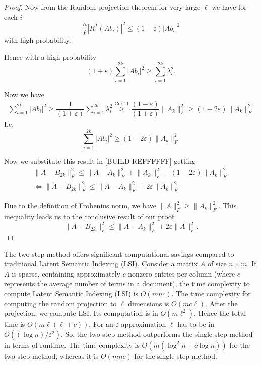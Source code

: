 \documentclass[a4paper,11pt,DIV=15]{scrartcl} %
\renewcommand{\epsilon}{\varepsilon}
\theoremstyle{plain}
\theoremstyle{definition}
\begin{document}
\begin{proof}
Now from the Random projection theorem for very large $\ell$ we have for each $i$
\[
 \dfrac{n}{\ell}| R^T (Ab_i)|^2 \leq (1+\epsilon) |Ab_i|^2
\]
with high probability.

Hence with a high probability
\[
(1+\epsilon) \sum_{i=1}^{2k} |A b_i|^2 \geq \sum_{i=1}^{2k} \lambda_i^2.
\]

Now we have
\begin{align*}
    \sum_{i=1}^{2k} |A b_i|^2 \geq \dfrac{1}{(1+\epsilon)} \sum_{i=1}^{2k} \lambda_i^2 
    \overset{\text{Cor.11}}{\geq} \dfrac{(1-\epsilon)}{(1+\epsilon)} \lVert A_k \rVert_F^2 
    \geq (1-2\epsilon) \lVert A_k \rVert_F^2
\end{align*}
I.e.
\[
\sum_{i=1}^{2k} |A b_i|^2 \geq (1-2\epsilon) \lVert A_k \rVert_F^2
\]

Now we substitute this result in [BUILD REFFFFFF] getting
\begin{align*}
    \lVert A - B_{2k} \rVert_F^2 \leq \lVert A - A_k \rVert_F^2 + \lVert A_k \rVert_F^2 - (1-2\epsilon) \lVert A_k \rVert_F^2\\
\iff \lVert A - B_{2k} \rVert_F^2 \leq \lVert A - A_k \rVert_F^2 + 2\epsilon\lVert A_k \rVert_F^2
\end{align*}

Due to the definition of Frobenius norm, we have  $\lVert A \rVert_F^2 \geq \lVert A_k \rVert_F^2$. This inequality leads us to the conclusive result of our proof
\[
\lVert A - B_{2k} \rVert_F^2 \leq \lVert A - A_k \rVert_F^2 + 2\epsilon\lVert A \rVert_F^2.
\]
\end{proof}

The two-step method offers significant computational savings compared to traditional Latent Semantic Indexing (LSI).
Consider a matrix \( A \) of size \( n \times m \). If \( A \) is sparse, containing approximately \( c \) nonzero entries per column (where \( c \) represents the average number of terms in a document), the time complexity to compute Latent Semantic Indexing (LSI) is \( O(mnc) \).
The time complexity for computing the random projection to \( \ell \) dimensions is \( O(mc\ell) \).
After the projection, we compute LSI. Its computation is in $O(m\ell^2)$. Hence the total time is $O(m\ell(\ell+c))$.
For an $\epsilon$ approximation $\ell$ has to be in $O((\log n)/\epsilon^2)$. 
So, the two-step method outperforms the single-step method in terms of runtime. The time complexity is \(O(m(\log^2 n + c \log n))\) for the two-step method, whereas it is \(O(mnc)\) for the single-step method.
\end{document}
